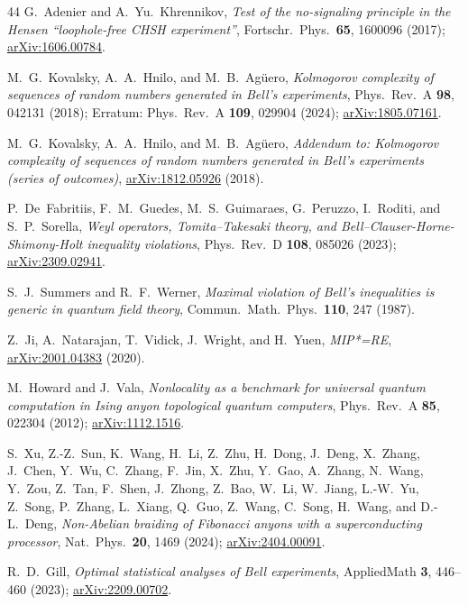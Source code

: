 \documentclass[aps,pra,twocolumn,superscriptaddress,longbibliography,floatfix,nofootinbib]{revtex4-2}
\begin{document}
\begin{thebibliography}{44}
G.~Adenier and A.~Yu.~Khrennikov,
\emph{Test of the no-signaling principle in the Hensen ``loophole-free CHSH experiment''},
Fortschr.\ Phys.\ \textbf{65}, 1600096 (2017);
\href{https://arxiv.org/abs/1606.00784}{arXiv:1606.00784}.

M.~G.~Kovalsky, A.~A.~Hnilo, and M.~B.~Ag\"uero,
\emph{Kolmogorov complexity of sequences of random numbers generated in Bell's experiments},
Phys.\ Rev.\ A \textbf{98}, 042131 (2018); Erratum: Phys.\ Rev.\ A
\textbf{109}, 029904 (2024);
\href{https://arxiv.org/abs/1805.07161}{arXiv:1805.07161}.

M.~G.~Kovalsky, A.~A.~Hnilo, and M.~B.~Ag\"uero,
\emph{Addendum to: Kolmogorov complexity of sequences of random numbers generated in Bell's experiments (series of outcomes)},
\href{https://arxiv.org/abs/1812.05926}{arXiv:1812.05926} (2018).

P.~De~Fabritiis, F.~M.~Guedes, M.~S.~Guimaraes, G.~Peruzzo, I.~Roditi, and S.~P.~Sorella,
\emph{Weyl operators, Tomita--Takesaki theory, and Bell--Clauser-Horne-Shimony-Holt inequality violations},
Phys.\ Rev.\ D \textbf{108}, 085026 (2023);
\href{https://arxiv.org/abs/2309.02941}{arXiv:2309.02941}.

S.~J.~Summers and R.~F.~Werner,
\emph{Maximal violation of Bell's inequalities is generic in quantum field theory},
Commun.\ Math.\ Phys.\ \textbf{110}, 247 (1987).

Z.~Ji, A.~Natarajan, T.~Vidick, J.~Wright, and H.~Yuen,
\emph{MIP*=RE},
\href{https://arxiv.org/abs/2001.04383}{arXiv:2001.04383} (2020).

M.~Howard and J.~Vala,
\emph{Nonlocality as a benchmark for universal quantum computation in Ising anyon topological quantum computers},
Phys.\ Rev.\ A \textbf{85}, 022304 (2012);
\href{https://arxiv.org/abs/1112.1516}{arXiv:1112.1516}.

S.~Xu, Z.-Z.~Sun, K.~Wang, H.~Li, Z.~Zhu, H.~Dong, J.~Deng, X.~Zhang,
J.~Chen, Y.~Wu, C.~Zhang, F.~Jin, X.~Zhu, Y.~Gao, A.~Zhang, N.~Wang,
Y.~Zou, Z.~Tan, F.~Shen, J.~Zhong, Z.~Bao, W.~Li, W.~Jiang, L.-W.~Yu,
Z.~Song, P.~Zhang, L.~Xiang, Q.~Guo, Z.~Wang, C.~Song, H.~Wang,
and D.-L.~Deng,
\emph{Non-Abelian braiding of Fibonacci anyons with a superconducting
processor},
Nat.\ Phys.\ \textbf{20}, 1469 (2024);
\href{https://arxiv.org/abs/2404.00091}{arXiv:2404.00091}.

R.~D.~Gill,
\emph{Optimal statistical analyses of Bell experiments},
AppliedMath \textbf{3}, 446--460 (2023);
\href{https://arxiv.org/abs/2209.00702}{arXiv:2209.00702}.

\end{thebibliography}
\end{document}
